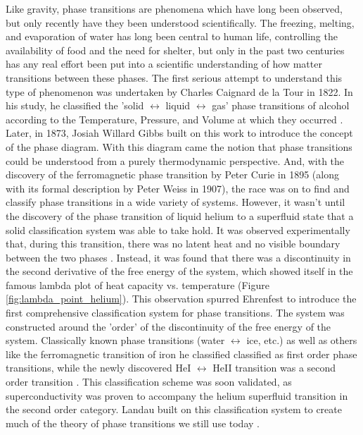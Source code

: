 \documentclass[%
 reprint,
 amsmath,amssymb,
 aps,
 pra,
]{revtex4-1}
\begin{document}
Like gravity, phase transitions are phenomena which have long been observed, but only recently have they been understood scientifically. The freezing, melting, and evaporation of water has long been central to human life, controlling the availability of food and the need for shelter, but only in the past two centuries has any real effort been put into a scientific understanding of how matter transitions between these phases. The first serious attempt to understand this type of phenomenon was undertaken by Charles Caignard de la Tour in 1822. In his study, he classified the 'solid $\leftrightarrow$ liquid $\leftrightarrow$ gas' phase transitions of alcohol according to the Temperature, Pressure, and Volume at which they occurred \cite{phase_history}. Later, in 1873, Josiah Willard Gibbs built on this work to introduce the concept of the phase diagram\cite{phase_history, gibbs}. With this diagram came the notion that phase transitions could be understood from a purely thermodynamic perspective. And, with the discovery of the ferromagnetic phase transition by Peter Curie in 1895 (along with its formal description by Peter Weiss in 1907), the race was on to find and classify phase transitions in a wide variety of systems. However, it wasn't until the discovery of the phase transition of liquid helium to a superfluid state that a solid classification system was able to take hold. It was observed experimentally that, during this transition, there was no latent heat and no visible boundary between the two phases \cite{phase_history}. Instead, it was found that there was a discontinuity in the second derivative of the free energy of the system, which showed itself in the famous lambda plot of heat capacity vs. temperature (Figure \ref{fig:lambda_point_helium}). This observation spurred Ehrenfest to introduce the first comprehensive classification system for phase transitions. The system was constructed around the 'order' of the discontinuity of the free energy of the system. Classically known phase transitions (water $\leftrightarrow$ ice, etc.) as well as others like the ferromagnetic transition of iron he classified classified as first order phase transitions, while the newly discovered HeI $\leftrightarrow$ HeII transition was a second order transition \cite{physics_of_phase, manual}. This classification scheme was soon validated, as superconductivity was proven to accompany the helium superfluid transition in the second order category. Landau built on this classification system to create much of the theory of phase transitions we still use today \cite{manual}.
\end{document}
